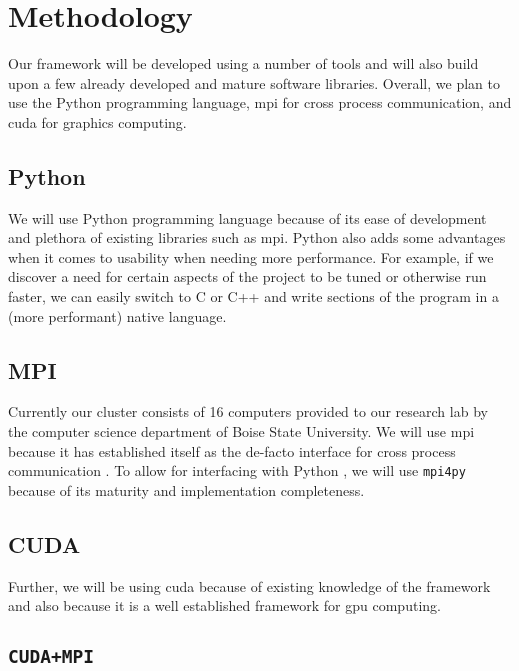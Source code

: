 \section{Methodology}

Our framework will be developed using a number of tools and will also build
upon a few already developed and mature software libraries. Overall, we plan to
use the Python programming language, \gls{mpi} for cross process communication,
and \gls{cuda} for graphics computing.

\subsection{Python}

We will use Python programming language because of its ease of development and
plethora of existing libraries such as \gls{mpi}. Python also adds some
advantages when it comes to usability when needing more performance.  For
example, if we discover a need for certain aspects of the project to be tuned
or otherwise run faster, we can easily switch to C or C++ and write sections of
the program in a (more performant) native language.

\subsection{MPI}

Currently our cluster consists of 16 computers provided to our research lab by
the computer science department of Boise State University. We will use
\gls{mpi} because it has established itself as the de-facto interface for cross
process communication \cite{website:MPI-Tutorial}. To allow for interfacing
with Python \cite{website:mpi-4-python}, we will use \texttt{mpi4py} because of
its maturity and implementation completeness.

\subsection{CUDA}

Further, we will be using \gls{cuda} because of existing knowledge of the
framework and also because it is a well established framework for \gls{gpu}
computing.


\subsection{\texttt{CUDA+MPI}}

